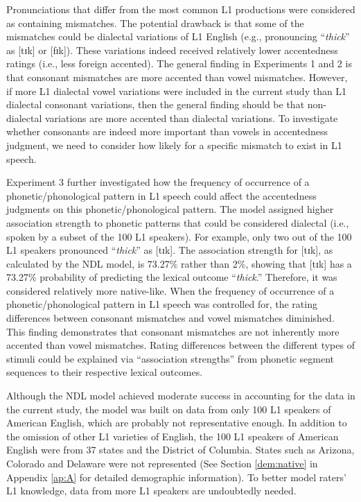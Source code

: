 Pronunciations that differ from the most common L1 productions were considered as containing mismatches. The potential drawback is that some of the mismatches could be dialectal variations of L1 English (e.g., pronouncing “\textit{thick}” as [tɪk] or [fɪk]). These variations indeed received relatively lower accentedness ratings (i.e., less foreign accented). The general finding in Experiments 1 and 2 is that consonant mismatches are more accented than vowel mismatches. However, if more L1 dialectal vowel variations were included in the current study than L1 dialectal consonant variations, then the general finding should be that non-dialectal variations are more accented than dialectal variations. To investigate whether consonants are indeed more important than vowels in accentedness judgment, we need to consider how likely for a specific mismatch to exist in L1 speech. 

Experiment 3 further investigated how the frequency of occurrence of a phonetic/phonological pattern in L1 speech could affect the accentedness judgments on this phonetic/phonological pattern. The model assigned higher association strength to phonetic patterns that could be considered dialectal (i.e., spoken by a subset of the 100 L1 speakers). For example, only two out of the 100 L1 speakers pronounced “\textit{thick}” as [tɪk]. The association strength for [tɪk], as calculated by the NDL model, is 73.27\% rather than 2\%, showing that [tɪk] has a 73.27\% probability of predicting the lexical outcome “\textit{thick}.” Therefore, it was considered relatively more native-like. When the frequency of occurrence of a phonetic/phonological pattern in L1 speech was controlled for, the rating differences between consonant mismatches and vowel mismatches diminished. This finding demonstrates that consonant mismatches are not inherently more accented than vowel mismatches. Rating differences between the different types of stimuli could be explained via “association strengths” from phonetic segment sequences to their respective lexical outcomes.

Although the NDL model achieved moderate success in accounting for the data in the current study, the model was built on data from only 100 L1 speakers of American English, which are probably not representative enough. In addition to the omission of other L1 varieties of English, the 100 L1 speakers of American English were from 37 states and the District of Columbia. States such as Arizona, Colorado and Delaware were not represented (See Section \ref{dem:native} in Appendix \ref{ap:A} for detailed demographic information). To better model raters’ L1 knowledge, data from more L1 speakers are undoubtedly needed. 

